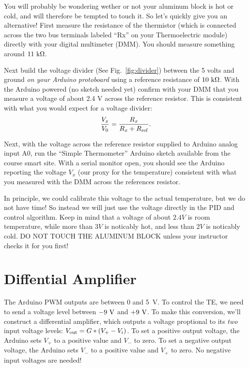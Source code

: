\documentclass[12pt]{article}
\begin{document}
You will probably be wondering wether or not your aluminum block is hot or cold,
and will therefore be tempted to touch it.  So let's quickly give you an
alternative!  First measure the resistance of the thermistor (which is connected
across the two bus terminals labeled ``Rx'' on your Thermoelectric module)
directly with your digital multimeter (DMM).  You should measure something
around $11~{\rm k\Omega}$.

Next build the voltage divider (See Fig.~\ref{fig:divider}) between the 5 volts
and ground {\em on your Arduino protoboard} using a reference resistance of
$10~{\rm k\Omega}$.  With the Arduino powered (no sketch needed yet) confirm
with your DMM that you measure a voltage of about 2.4 V across the reference
resistor.  This is consistent with what you would expect for a voltage divider:
\begin{displaymath}
\frac{V_x}{V_0} = \frac{R_x}{R_x + R_{\rm ref}}.
\end{displaymath}

Next, with the voltage across the reference resistor supplied to Arduino analog
input A0, run the ``Simple Thermometer'' Arduino sketch available from the
course smart site.  With a serial monitor open, you should see the Arduino
reporting the voltage $V_x$ (our proxy for the temperature) consistent with what
you measured with the DMM across the references resistor.

In principle, we could calibrate this voltage to the actual temperature, but we
do not have time!  So instead we will just use the voltage directly in the PID
and control algorithm.  Keep in mind that a voltage of about $2.4 V$ is room
temperature, while more than $3 V$ is noticably hot, and less than $2 V$ is
noticably cold.  DO NOT TOUCH THE ALUMINUM BLOCK unless your instructor checks
it for you first!

\section{Diffential Amplifier}

The Arduino PWM outputs are between 0 and 5~V.  To control the TE, we need to
send a voltage level between $-9~{\rm V}$ and $+9~{\rm V}$.  To make this
conversion, we'll construct a differential amplifier, which outputs a voltage
proptional to its {\em two} input voltage levels: $V_{\rm out} = G * (V_+ -
V_i)$.  To set a positive output voltage, the Arduino sets $V_+$ to a positive
value and $V_-$ to zero.  To set a negative output voltage, the Arduino sets
$V_-$ to a positive value and $V_+$ to zero.  No negative input voltages are
needed!
\end{document}
